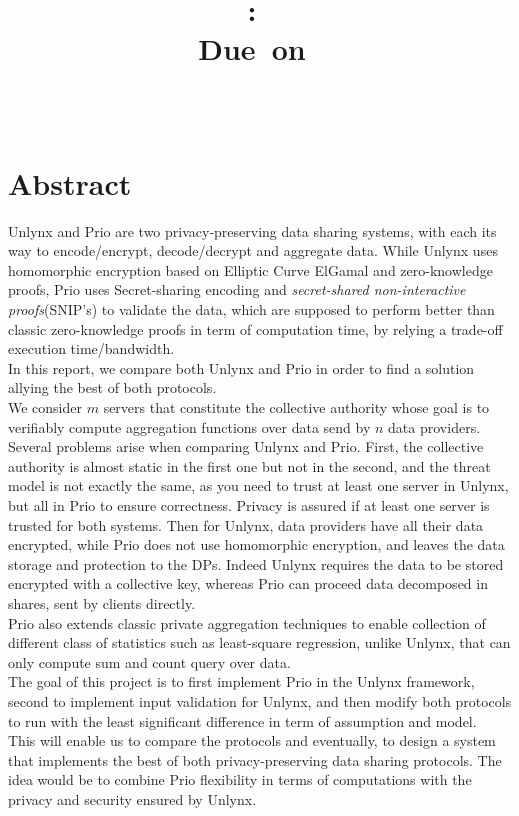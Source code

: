 \documentclass{article}
\title{
\logoepfl
\vspace{2in}
\textmd{\textbf{\hmwkClass:\ \hmwkTitle}}\\
\normalsize\vspace{0.1in}\small{Due\ on\ \hmwkDueDate}\\
\vspace{0.1in}\large{\textit{\hmwkClassInstructor\ \hmwkClassTime}}
\author{\textbf{\hmwkAuthorName}}
\vspace{3in}
}
\begin{document}
\maketitle

\newpage
\section*{Abstract}
Unlynx and Prio are two privacy-preserving data sharing systems, with each its way to encode/encrypt, decode/decrypt and aggregate data. While Unlynx \cite{unlynx} uses homomorphic encryption based on Elliptic Curve ElGamal and zero-knowledge proofs, Prio \cite{prio} uses Secret-sharing encoding and \textit{secret-shared non-interactive proofs}(SNIP's) to validate the data, which are supposed to perform better than classic zero-knowledge proofs \cite{proof1,proof2} in term of computation time, by relying a trade-off execution time/bandwidth.\\
In this report, we compare both Unlynx and Prio in order to find a solution allying the best of both protocols.\\
We consider $m$ servers that constitute the collective authority whose goal is to verifiably compute aggregation functions over data send by $n$ data providers.\\
Several problems arise when comparing Unlynx and Prio. First, the collective authority is almost static in the first one but not in the second, and the threat model is not exactly the same, as you need to trust at least one server in Unlynx, but all in Prio to ensure correctness. Privacy is assured if at least one server is trusted for both systems. Then for Unlynx, data providers have all their data encrypted, while Prio does not use homomorphic encryption, and leaves the data storage and protection to the DPs. Indeed Unlynx requires the data to be stored encrypted with a collective key, whereas Prio can proceed data decomposed in shares, sent by clients directly.\\
Prio also extends classic private aggregation techniques to enable collection of different class of statistics such as least-square regression, unlike Unlynx, that can only compute sum and count query over data.\\
The goal of this project is to first implement Prio in the Unlynx framework, second to implement input validation for Unlynx, and then modify both protocols to run with the least significant difference in term of assumption and model.\\
This will enable us to compare the protocols and eventually, to design a system that implements the best of both privacy-preserving data sharing protocols. The idea would be to combine Prio flexibility in terms of computations with the privacy and security ensured by Unlynx.\\
\end{document}
